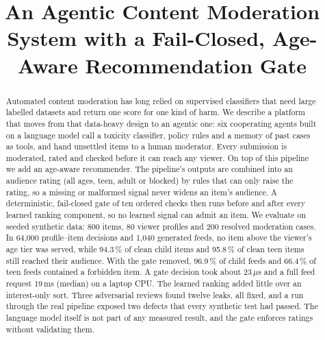 \documentclass[conference]{IEEEtran}
\newcommand{\pct}{\,\%}
\begin{document}
\title{An Agentic Content Moderation System with a Fail-Closed, Age-Aware Recommendation Gate}

\author{
\and
{}
}

\maketitle

\begin{abstract}
Automated content moderation has long relied on supervised classifiers that need large labelled datasets and return one score for one kind of harm. We describe a platform that moves from that data-heavy design to an agentic one: six cooperating agents built on a language model call a toxicity classifier, policy rules and a memory of past cases as tools, and hand unsettled items to a human moderator. Every submission is moderated, rated and checked before it can reach any viewer. On top of this pipeline we add an age-aware recommender. The pipeline's outputs are combined into an audience rating (all ages, teen, adult or blocked) by rules that can only raise the rating, so a missing or malformed signal never widens an item's audience. A deterministic, fail-closed gate of ten ordered checks then runs before and after every learned ranking component, so no learned signal can admit an item. We evaluate on seeded synthetic data: 800 items, 80 viewer profiles and 200 resolved moderation cases. In 64,000 profile--item decisions and 1,040 generated feeds, no item above the viewer's age tier was served, while 94.3\pct{} of clean child items and 95.8\pct{} of clean teen items still reached their audience. With the gate removed, 96.9\pct{} of child feeds and 66.4\pct{} of teen feeds contained a forbidden item. A gate decision took about 23\,$\mu$s and a full feed request 19\,ms (median) on a laptop CPU. The learned ranking added little over an interest-only sort. Three adversarial reviews found twelve leaks, all fixed, and a run through the real pipeline exposed two defects that every synthetic test had passed. The language model itself is not part of any measured result, and the gate enforces ratings without validating them.
\end{abstract}
\end{document}
